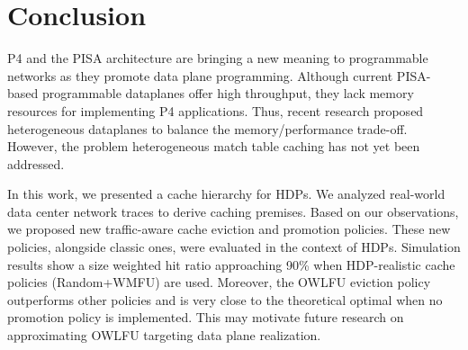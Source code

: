 \section{Conclusion}\label{inf:sec:conclusion}

P4 and the PISA architecture are bringing a new meaning to programmable networks as they promote data plane programming.
Although current PISA-based programmable dataplanes offer high throughput, they lack memory resources for implementing P4 applications.
Thus, recent research proposed heterogeneous dataplanes to balance the memory/performance trade-off.
However, the problem heterogeneous match table caching has not yet been addressed.

In this work, we presented a cache hierarchy for HDPs.
We analyzed real-world data center network traces to derive caching premises.
Based on our observations, we proposed new traffic-aware cache eviction and promotion policies.
These new policies, alongside classic ones, were evaluated in the context of HDPs.
Simulation results show a size weighted hit ratio approaching 90\% when HDP-realistic cache policies (Random+WMFU) are used.
Moreover, the OWLFU eviction policy outperforms other policies and is very close to the theoretical optimal when no promotion policy is implemented.
This may motivate future research on approximating OWLFU targeting data plane realization.